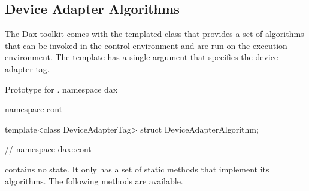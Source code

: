 

\subsection{Device Adapter Algorithms}
\label{sec:DeviceAdapterAlgorithms}


The Dax toolkit comes with the templated class
 that provides a set of algorithms that can
be invoked in the control environment and are run on the execution
environment. The template has a single argument that specifies the device
adapter tag.

\begin{daxexample}{Prototype for \protect{}.}
namespace dax {
namespace cont {

template<class DeviceAdapterTag>
struct DeviceAdapterAlgorithm;

}
} // namespace dax::cont
\end{daxexample}

 contains no state. It only has a
set of static methods that implement its algorithms. The following methods
are available.

